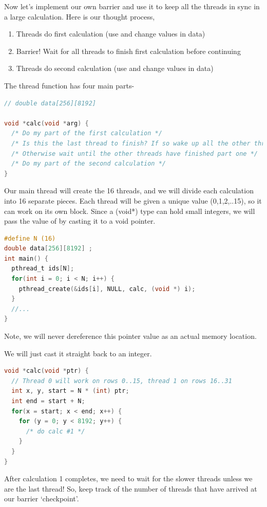 Now let's implement our own barrier and use it to keep all the threads in sync in a large calculation.
Here is our thought process,

\begin{enumerate}
\item Threads do first calculation (use and change values in data)
\item Barrier! Wait for all threads to finish first calculation before continuing
\item Threads do second calculation (use and change values in data)
\end{enumerate}

The thread function has four main parts-

\begin{lstlisting}[language=C]
// double data[256][8192]

void *calc(void *arg) {
  /* Do my part of the first calculation */
  /* Is this the last thread to finish? If so wake up all the other threads! */
  /* Otherwise wait until the other threads have finished part one */
  /* Do my part of the second calculation */
}
\end{lstlisting}

Our main thread will create the 16 threads, and we will divide each calculation into 16 separate pieces.
Each thread will be given a unique value (0,1,2,..15), so it can work on its own block.
Since a (void*) type can hold small integers, we will pass the value of  by casting it to a void pointer.

\begin{lstlisting}[language=C]
#define N (16)
double data[256][8192] ;
int main() {
  pthread_t ids[N];
  for(int i = 0; i < N; i++) {
    pthread_create(&ids[i], NULL, calc, (void *) i);
  }
  //...
}
\end{lstlisting}

Note, we will never dereference this pointer value as an actual memory location.

We will just cast it straight back to an integer.

\begin{lstlisting}[language=C]
void *calc(void *ptr) {
  // Thread 0 will work on rows 0..15, thread 1 on rows 16..31
  int x, y, start = N * (int) ptr;
  int end = start + N;
  for(x = start; x < end; x++) {
    for (y = 0; y < 8192; y++) {
      /* do calc #1 */
    }
  }
}
\end{lstlisting}

After calculation 1 completes, we need to wait for the slower threads unless we are the last thread!
So, keep track of the number of threads that have arrived at our barrier `checkpoint'.

